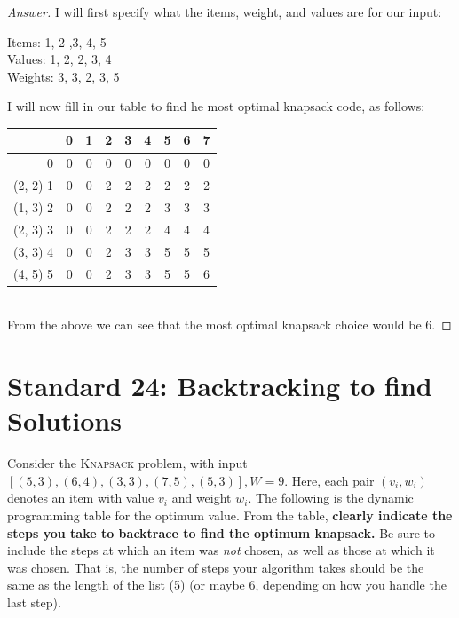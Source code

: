 \documentclass[11pt]{article}
\theoremstyle{definition}
\theoremstyle{definition}
\theoremstyle{definition}
\begin{document}
\begin{proof}[Answer]
I will first specify what the items, weight, and values are for our input: \\
\begin{center}
Items: 1, 2 ,3, 4, 5 \\
Values: 1, 2, 2, 3, 4 \\
Weights: 3, 3, 2, 3, 5 \\
\end{center}
I will now fill in our table to find he most optimal knapsack code, as follows: \\
\begin{tabular}{|r|c|c|c|c|c|c|c|c|}
\hline
& 0& 1& 2& 3& 4& 5& 6& 7 \\ 
 \hline
0 & 0 & 0 & 0 & 0 & 0 & 0 & 0 & 0  \\ 
\hline
(2, 2) 1 & 0 & 0 & 2 & 2 & 2 & 2 & 2 & 2  \\ 
\hline
(1, 3) 2 & 0 & 0 & 2 & 2 & 2 & 3 & 3 & 3  \\ 
\hline
(2, 3) 3 & 0 & 0 & 2 & 2 & 2 & 4 & 4 & 4  \\ 
\hline
(3, 3) 4 & 0 & 0 & 2 & 3 & 3 & 5 & 5 & 5  \\ 
\hline
(4, 5) 5 & 0 & 0 & 2 & 3 & 3 & 5 & 5 & 6  \\ 
\hline
\end{tabular}\\


From the above we can see that the most optimal knapsack choice would be 6.
\end{proof}

\newpage
\section{Standard 24: Backtracking to find Solutions}
Consider the \textsc{Knapsack} problem, with input $[ (5, 3), (6, 4), (3, 3), (7, 5),(5, 3)], W=9$. Here, each pair $(v_i, w_i)$ denotes an item with value $v_i$ and weight $w_i$. The following is the dynamic programming table for the optimum value. From the table, \textbf{clearly indicate the steps you take to backtrace to find the optimum knapsack.} Be sure to include the steps at which an item was \emph{not} chosen, as well as those at which it was chosen. That is, the number of steps your algorithm takes should be the same as the length of the list (5) (or maybe 6, depending on how you handle the last step). 
\end{document}
